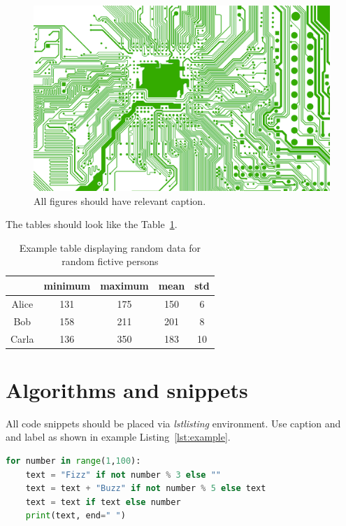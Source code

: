 \documentclass{pjtemplate}
\begin{document}
\begin{figure}[h!]
\centering
\includegraphics[width=1.\textwidth]{example.png}
\caption{All figures should have relevant caption.}
\label{fig:example}
\end{figure}

\noindent
The tables should look like the Table~\ref{tab:example}.

\begin{table}[h!]
\centering
\caption{Example table displaying random data for random fictive persons}
\label{tab:example}

\begin{tabular}{c|c|c|c|c}
      & minimum & maximum & mean & std \\ \hline
Alice & 131     & 175     & 150  & 6   \\
Bob   & 158     & 211     & 201  & 8   \\
Carla & 136     & 350     & 183  & 10 
\end{tabular}
\end{table}




\section{Algorithms and snippets}

All code snippets should be placed via \emph{lstlisting} environment. Use caption and and label as shown in example Listing~\ref{lst:example}.


\begin{lstlisting}[caption={The following code snippet displays a solution of the Fizz Buzz problem.},label={lst:example},language=Python]
for number in range(1,100):
    text = "Fizz" if not number % 3 else ""
    text = text + "Buzz" if not number % 5 else text
    text = text if text else number
    print(text, end=" ")
\end{lstlisting}
\end{document}
